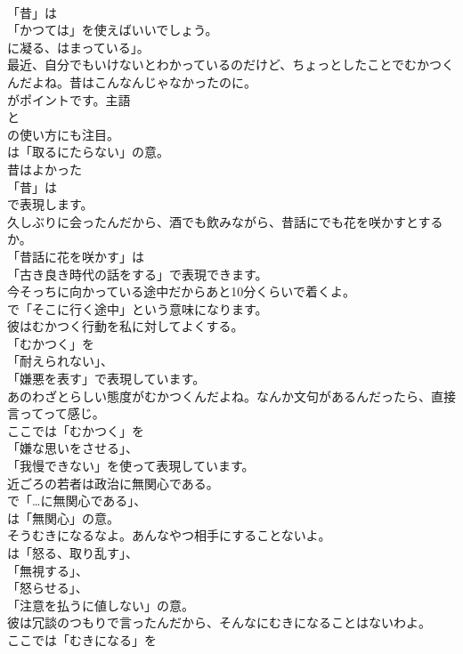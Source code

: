 \documentclass[8pt]{extreport}
\begin{document}
\begin{CJK}{UTF8}{min}
\\	「昔」は
\\	「かつては」を使えばいいでしょう。
\\	に凝る、はまっている」。	
\\	最近、自分でもいけないとわかっているのだけど、ちょっとしたことでむかつくんだよね。昔はこんなんじゃなかったのに。 
\\	がポイントです。主語 
\\	と 
\\	の使い方にも注目。
\\	は「取るにたらない」の意。	
\\	昔はよかった 
\\	「昔」は
\\	で表現します。	
\\	久しぶりに会ったんだから、酒でも飲みながら、昔話にでも花を咲かすとするか。 
\\	「昔話に花を咲かす」は
\\	「古き良き時代の話をする」で表現できます。	
\\	今そっちに向かっている途中だからあと10分くらいで着くよ。 
\\	で「そこに行く途中」という意味になります。	
\\	彼はむかつく行動を私に対してよくする。 
\\	「むかつく」を
\\	「耐えられない」、
\\	「嫌悪を表す」で表現しています。	
\\	あのわざとらしい態度がむかつくんだよね。なんか文句があるんだったら、直接言ってって感じ。 
\\	ここでは「むかつく」を
\\	「嫌な思いをさせる」、
\\	「我慢できない」を使って表現しています。	
\\	近ごろの若者は政治に無関心である。 
\\	で「…に無関心である」、
\\	は「無関心」の意。	
\\	そうむきになるなよ。あんなやつ相手にすることないよ。 
\\	は「怒る、取り乱す」、
\\	「無視する」、
\\	「怒らせる」、
\\	「注意を払うに値しない」の意。	
\\	彼は冗談のつもりで言ったんだから、そんなにむきになることはないわよ。 
\\	ここでは「むきになる」を

\end{CJK}
\end{document}
